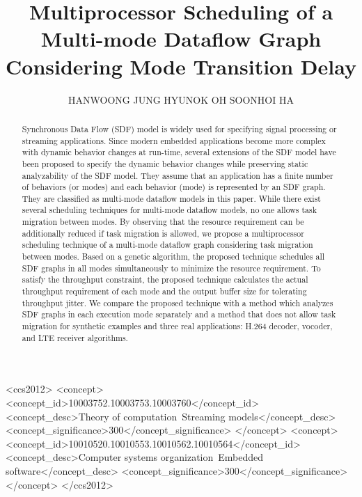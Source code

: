 \documentclass[prodmode,acmtecs]{acmsmall}
\begin{document}

\title{Multiprocessor Scheduling of a Multi-mode Dataflow Graph Considering Mode Transition Delay}
\author{HANWOONG JUNG
HYUNOK OH
SOONHOI HA
}

\begin{abstract}
Synchronous Data Flow (SDF) model is widely used for specifying signal processing or streaming applications. Since modern embedded applications become more complex with dynamic behavior changes at run-time, several extensions of the SDF model have been proposed to specify the dynamic behavior changes while preserving static analyzability of the SDF model. They assume that an application has a finite number of behaviors (or modes) and each behavior (mode) is represented by an SDF graph. They are classified as multi-mode dataflow models in this paper. While there exist several scheduling techniques for multi-mode dataflow models, no one allows task migration between modes. By observing that the resource requirement can be additionally reduced if task migration is allowed, we propose a multiprocessor scheduling technique of a multi-mode dataflow graph considering task migration between modes. Based on a genetic algorithm, the proposed technique schedules all SDF graphs in all modes simultaneously to minimize the resource requirement. To satisfy the throughput constraint, the proposed technique calculates the actual throughput requirement of each mode and the output buffer size for tolerating throughput jitter. We compare the proposed technique with a method which analyzes SDF graphs in each execution mode separately and a method that does not allow task migration for synthetic examples and three real applications: H.264 decoder, vocoder, and LTE receiver algorithms.
\end{abstract}


\begin{CCSXML}
<ccs2012>
  <concept>
    <concept_id>10003752.10003753.10003760</concept_id>
    <concept_desc>Theory of computation~Streaming models</concept_desc>
    <concept_significance>300</concept_significance>
  </concept>
  <concept>
    <concept_id>10010520.10010553.10010562.10010564</concept_id>
    <concept_desc>Computer systems organization~Embedded software</concept_desc>
    <concept_significance>300</concept_significance>
  </concept>
</ccs2012>
\end{CCSXML}
\end{document}
